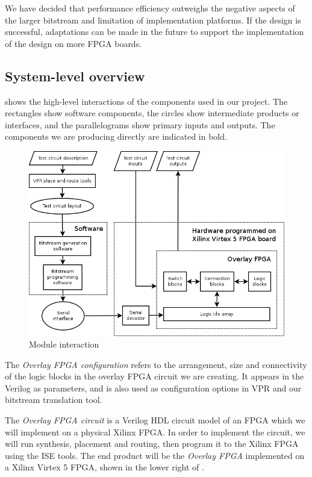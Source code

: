 We have decided that performance efficiency outweighs the negative aspects of the larger bitstream and limitation of implementation platforms.
If the design is successful, adaptations can be made in the future to support the implementation of the design on more FPGA boards.



\subsection{System-level overview} %
\label{system-overview}

 shows the high-level interactions of the components used in our project.
The rectangles show software components, the circles show intermediate products or interfaces, and the parallelograms show primary inputs and outputs.
The components we are producing directly are indicated in bold.

\begin{figure}[!h]
	\centering
	\includegraphics[scale=0.6]{modules.png}
	\caption{Module interaction}
	\label{module-diagram}
\end{figure}

The \emph{Overlay FPGA configuration} refers to the arrangement, size and connectivity of the logic blocks in the overlay FPGA circuit we are creating.
It appears in the Verilog as parameters, and is also used as configuration options in VPR and our bitstream translation tool.

The \emph{Overlay FPGA circuit} is a Verilog HDL circuit model of an FPGA which we will implement on a physical Xilinx FPGA.
In order to implement the circuit, we will run synthesis, placement and routing, then program it to the Xilinx FPGA using the ISE tools.
The end product will be the \emph{Overlay FPGA} implemented on a Xilinx Virtex 5 FPGA, shown in the lower right of .

